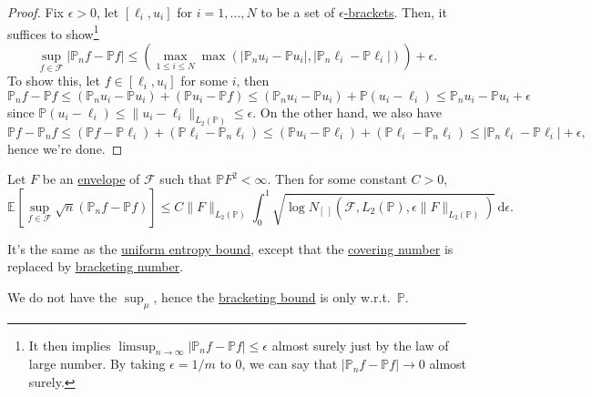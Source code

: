\begin{proof}
	Fix \(\epsilon > 0\), let \([\ell _i, u_i]\) for \(i = 1, \dots , N\) to be a set of \hyperref[def:eps-bracket]{\(\epsilon \)-brackets}. Then, it suffices to show\footnote{It then implies \(\limsup_{n \to \infty} \vert \mathbb{P} _n f - \mathbb{P} f \vert \leq \epsilon \) almost surely just by the law of large number. By taking \(\epsilon = 1 / m\) to \(0\), we can say that \(\vert \mathbb{P} _n f - \mathbb{P} f \vert \to 0\) almost surely.}
	\[
		\sup _{f\in \mathscr{F} } \vert \mathbb{P} _n f - \mathbb{P} f \vert
		\leq \left( \max _{1 \leq i \leq N } \max (\vert \mathbb{P} _n u_i - \mathbb{P} u_i \vert , \vert \mathbb{P} _n \ell _i - \mathbb{P} \ell _i \vert ) \right) + \epsilon.
	\]
	To show this, let \(f\in [\ell _i, u_i]\) for some \(i\), then
	\[
		\mathbb{P} _n f - \mathbb{P} f
		\leq (\mathbb{P} _n u_i - \mathbb{P} u_i) + (\mathbb{P} u_i - \mathbb{P} f)
		\leq (\mathbb{P} _n u_i - \mathbb{P} u_i) + \mathbb{P} (u_i - \ell _i)
		\leq \mathbb{P} _n u_i - \mathbb{P} u_i + \epsilon
	\]
	since \(\mathbb{P} (u_i - \ell _i) \leq \lVert u_i - \ell _i \rVert _{L_2(\mathbb{P} )} \leq \epsilon \). On the other hand, we also have
	\[
		\mathbb{P} f - \mathbb{P} _n f
		\leq (\mathbb{P} f - \mathbb{P} \ell _i) + (\mathbb{P} \ell _i - \mathbb{P} _n \ell _i)
		\leq (\mathbb{P} u_i - \mathbb{P} \ell _i) + (\mathbb{P} \ell _i - \mathbb{P} _n \ell _i)
		\leq \vert \mathbb{P} _n \ell _i - \mathbb{P} \ell _i \vert + \epsilon,
	\]
	hence we're done.
\end{proof}

\begin{theorem}\label{thm:bracketing-bound}
	Let \(F\) be an \hyperref[def:envelope]{envelope} of \(\mathscr{F} \) such that \(\mathbb{P} F^2 < \infty \). Then for some constant \(C > 0\),
	\[
		\mathbb{E}_{}\left[\sup _{f\in \mathscr{F} } \sqrt{n} (\mathbb{P} _n f - \mathbb{P} f) \right]
		\leq C \lVert F \rVert _{L_2(\mathbb{P} )} \int_{0}^{1} \sqrt{\log N_{[\ ]}(\mathscr{F} , L_2(\mathbb{P} ), \epsilon \lVert F \rVert _{L_2(\mathbb{P} )})}  \,\mathrm{d}\epsilon .
	\]
\end{theorem}

It's the same as the \hyperref[thm:uniform-entropy-integral-bound]{uniform entropy bound}, except that the \hyperref[def:covering-number]{covering number} is replaced by \hyperref[def:bracketing-number]{bracketing number}.

\begin{remark}
	We do not have the \(\sup _\mu \), hence the \hyperref[thm:bracketing-bound]{bracketing bound} is only w.r.t.\ \(\mathbb{P} \).
\end{remark}